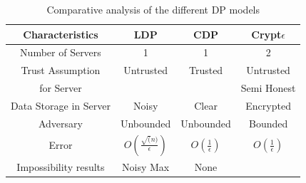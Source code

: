 \begin{table}[h!]
\centering
\caption {Comparative analysis of the different DP models}
 \begin{tabular}{||c |c| c| c||}  
\hline\hline
\textbf{Characteristics} & \textbf{LDP}  & \textbf{CDP}  & \textbf{Crypt$\epsilon$}  \\ [0.5ex] 
 \hline\hline Number of Servers & 1& 1 & 2 \\\hline
Trust Assumption & Untrusted & Trusted & Untrusted \\  for Server & & & Semi Honest  \\ \hline
Data Storage in Server & Noisy & Clear & Encrypted \\\hline
Adversary & Unbounded & Unbounded & Bounded \\\hline
 Error & $O(\frac{\sqrt(n)}{\epsilon})$& $O(\frac{1}{\epsilon})$ & $O(\frac{1}{\epsilon})$\\\hline
 Impossibility results & Noisy Max & None &\\ 
  [1ex] 
 \hline
 \end{tabular}
\end{table}
